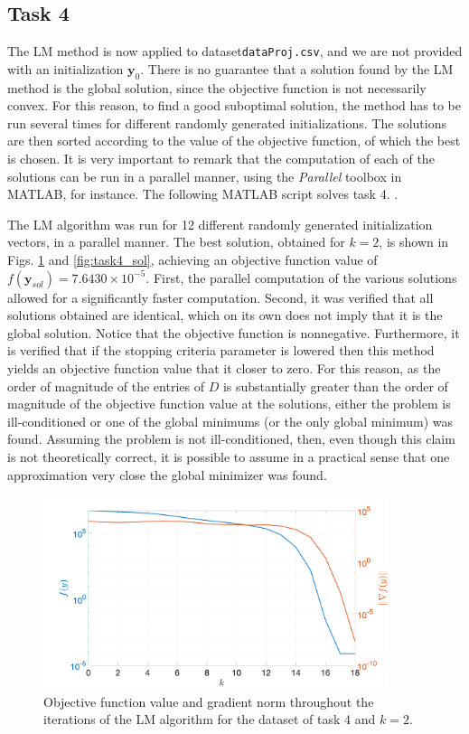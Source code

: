 \documentclass[12pt]{article}
\begin{document}
\subsection{Task 4}
The LM method is now applied to dataset\verb|dataProj.csv|, and we are not provided with an initialization $\mathbf{y}_0$. There is no guarantee that a solution found by the LM method is the global solution, since the objective function is not necessarily convex. For this reason, to find a good suboptimal solution, the method has to be run several times for different randomly generated initializations. The solutions are then sorted according to the value of the objective function, of which the best is chosen. It is very important to remark that the computation of each of the solutions can be run in a parallel manner, using the \textit{Parallel} toolbox in MATLAB, for instance. The following MATLAB script solves task 4.
.

The LM algorithm was run for 12 different randomly generated initialization vectors, in a parallel manner. The best solution, obtained for $k=2$, is shown in Figs. \ref{fig:task4_LM} and \ref{fig:task4_sol}, achieving an objective function value of $f(\mathbf{y}_{sol}) = 7.6430\times 10^{-5}$. First, the parallel computation of the various solutions allowed for a significantly faster computation. Second, it was verified that all solutions obtained are identical, which on its own does not imply that it is the global solution. Notice that the objective function is nonnegative. Furthermore, it is verified that if the stopping criteria parameter is lowered then this method yields an objective function value that it closer to zero. For this reason, as the order of magnitude of the entries of $D$ is substantially greater than the order of magnitude of the objective function value at the solutions, either the problem is ill-conditioned or one of the global minimums (or the only global minimum) was found. Assuming the problem is not ill-conditioned, then, even though this claim is not theoretically correct, it is possible to assume in a practical sense that one approximation very close the global minimizer was found. 
\begin{figure}[ht!]
	\centering
	\includegraphics[width=0.9\textwidth]{figures/task4_LM.png}
	\caption{Objective function value and gradient norm throughout the iterations of the LM algorithm for the dataset of task 4 and $k=2$.}
	\label{fig:task4_LM}
\end{figure}
\end{document}
